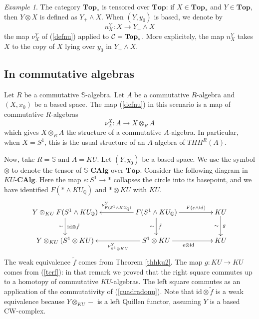\documentclass[a4paper,11pt]{amsart} %
\theoremstyle{definition} \newtheorem{defn}[equation]{Definition}
\theoremstyle{remark} \newtheorem{notation}[equation]{Notation}
\theoremstyle{plain} \newtheorem{teo}[equation]{Theorem}
\theoremstyle{plain} \newtheorem{lema}[equation]{Lemma}
\theoremstyle{plain} \newtheorem{prop}[equation]{Proposition}
\theoremstyle{plain} \newtheorem{corolario}[equation]{Corollary}
\theoremstyle{remark} \newtheorem{obs}[equation]{Remark}
\theoremstyle{remark} \newtheorem{sideobs}[equation]{Side remark}
\theoremstyle{remark} \newtheorem{ejercicio}[equation]{Exercise}
\theoremstyle{definition} \newtheorem{notn}[equation]{Notation}
\theoremstyle{remark} \newtheorem{ej}[equation]{Example}
\theoremstyle{remark} \newtheorem{contraej}[equation]{Counterexample}
\theoremstyle{plain} \newtheorem{conj}[equation]{Conjecture}
\renewcommand{\1}{\ensuremath{\mathbbm{1}}}
\newcommand{\Q}{\mathbb{Q}}
\renewcommand{\S}{\mathbb{S}}
\newcommand{\bej}{\begin{ej}}
\newcommand{\eej}{\end{ej}}
\newcommand{\id}{\mathrm{id}}
\newcommand{\CAlg}{\mbox{-}\mathbf{CAlg}}
\newcommand{\SCAlg}{\ensuremath{\mathbb{S}}\mbox{-}\ensuremath{\mathbf{CAlg}}}
\newcommand{\Top}{\ensuremath{\mathbf{Top}}}
\numberwithin{equation}{section}
\begin{document}
\bej The category $\Top_*$ is tensored over $\Top$: if $X\in \Top_*$ and $Y\in \Top$, then $Y\otimes X$ is defined as $Y_+\wedge X$. When $(Y,y_0)$ is based, we denote by \begin{equation}\label{nyx} n^Y_X:X\to Y_+\wedge X\end{equation} the map $\nu_X^Y$ of (\ref{defnu}) applied to $\C=\Top_*$. More explicitely, the map $n^Y_X$ takes $X$ to the copy of $X$ lying over $y_0$ in $Y_+\wedge X$. %
\eej



\subsection{In commutative algebras}
Let $R$ be a commutative $\S$-algebra. Let $A$ be a commutative $R$-algebra and $(X,x_0)$ be a based space. The map (\ref{defnu}) in this scenario is a map of commutative $R$-algebras \[\nu^X_A:A\to X\otimes_R A\] which gives $X\otimes_R A$ the structure of a commutative $A$-algebra. In particular, when $X=S^1$, this is the usual structure of an $A$-algebra of $THH^R(A)$.%


Now, take $R=\S$ and $A=KU$. Let $(Y,y_0)$ be a based space. We use the symbol $\otimes$ to denote the tensor of $\SCAlg$ over $\Top$. Consider the following diagram in $KU\CAlg$. Here the map $e:S^1\to *$ collapses the circle into its basepoint, and we have identified $F(*\wedge KU_\Q)$ and $*\otimes KU$ with $KU$. 
\begin{equation}\label{diagorra}\xymatrix@C+2pc{
Y\otimes_{KU} F(S^1\wedge KU_\Q) \ar[d]^-{\id \otimes \tilde f}_\sim & F(S^1\wedge KU_\Q) \ar[l]_-{\nu^Y_{F(S^1\wedge KU_\Q)}} \ar[d]^-{\tilde f}_\sim \ar[r]^-{F(e\wedge \id)} & KU \ar[d]^-g_-\sim \\
Y\otimes_{KU} (S^1\otimes KU)  & S^1\otimes KU  \ar[l]^-{\nu^Y_{S^1\otimes KU}} \ar[r]_{e\otimes \id} & KU }\end{equation}
The weak equivalence $\tilde f$ comes from Theorem \ref{thhku2}. The map $g:KU\to KU$ comes from (\ref{terf}): in that remark we proved that the right square commutes up to a homotopy of commutative $KU$-algebras. The left square commutes as an application of the commutativity of (\ref{cuadradonu}). Note that $\id\otimes \tilde f$ is a weak equivalence because $Y\otimes_{KU}-$ is a left Quillen functor, assuming $Y$ is a based CW-complex.



%
%
%
%
%
%
%
%
%
\end{document}
